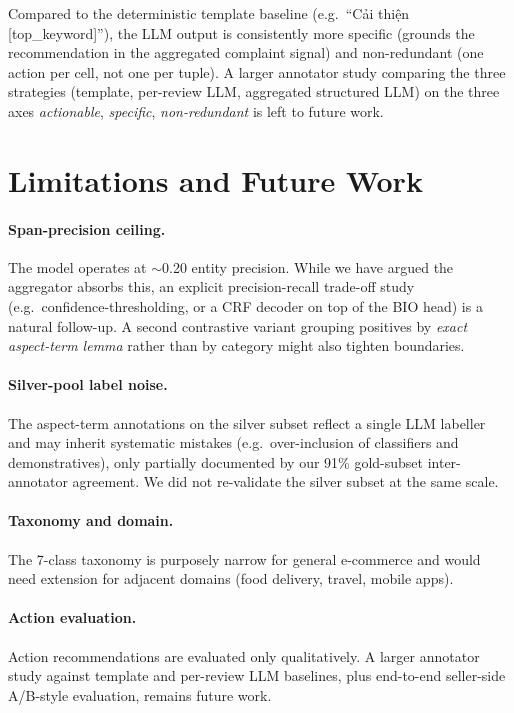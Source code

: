 \documentclass[conference]{IEEEtran}
\begin{document}
Compared to the deterministic template baseline (e.g.\ ``Cải thiện
[top\_keyword]''), the LLM output is consistently more specific
(grounds the recommendation in the aggregated complaint signal) and
non-redundant (one action per cell, not one per tuple). A larger
annotator study comparing the three strategies (template, per-review
LLM, aggregated structured LLM) on the three axes \textit{actionable},
\textit{specific}, \textit{non-redundant} is left to future work.

\section{Limitations and Future Work}

\paragraph{Span-precision ceiling.}
The model operates at $\sim$0.20 entity precision. While we have argued
the aggregator absorbs this, an explicit precision-recall trade-off
study (e.g.\ confidence-thresholding, or a CRF decoder on top of the
BIO head) is a natural follow-up. A second contrastive variant grouping
positives by \emph{exact aspect-term lemma} rather than by category
might also tighten boundaries.

\paragraph{Silver-pool label noise.}
The aspect-term annotations on the silver subset reflect a single LLM
labeller and may inherit systematic mistakes (e.g.\ over-inclusion of
classifiers and demonstratives), only partially documented by our 91\%
gold-subset inter-annotator agreement. We did not re-validate the
silver subset at the same scale.

\paragraph{Taxonomy and domain.}
The 7-class taxonomy is purposely narrow for general e-commerce and
would need extension for adjacent domains (food delivery, travel,
mobile apps).

\paragraph{Action evaluation.}
Action recommendations are evaluated only qualitatively. A larger
annotator study against template and per-review LLM baselines, plus
end-to-end seller-side A/B-style evaluation, remains future work.
\end{document}
